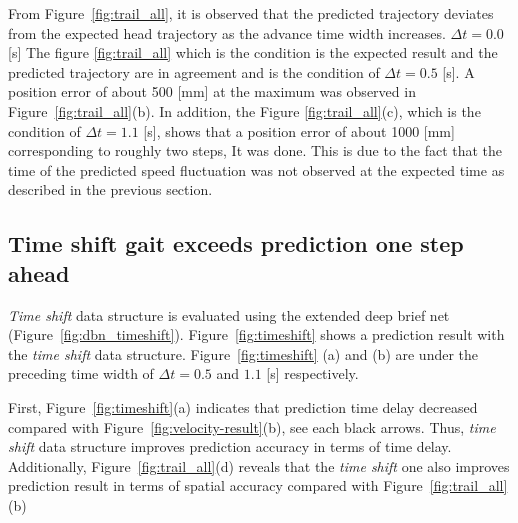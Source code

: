 \documentclass{sigchi}
\begin{document}
From Figure~\ref{fig:trail_all}, it is observed that the predicted trajectory deviates from the expected head trajectory as the advance time width increases. $ \Delta t = 0.0 $ [s] The figure \ref{fig:trail_all} which is the condition is the expected result and the predicted trajectory are in agreement and is the condition of $ \Delta t = 0.5 $ [s]. A position error of about 500 [mm] at the maximum was observed in Figure~\ref{fig:trail_all}(b). In addition, the Figure \ref{fig:trail_all}(c), which is the condition of $ \Delta t = 1.1 $ [s], shows that a position error of about 1000 [mm] corresponding to roughly two steps, It was done. This is due to the fact that the time of the predicted speed fluctuation was not observed at the expected time as described in the previous section.





\subsection{Time shift gait exceeds prediction one step ahead}

\textit{Time shift} data structure is evaluated using the extended deep brief net (Figure~\ref{fig:dbn_timeshift}). Figure~\ref{fig:timeshift} shows a prediction result with the \textit{time shift} data structure. Figure~\ref{fig:timeshift} (a) and (b) are under the preceding time width of $ \Delta t = 0.5$ and $1.1$ [s] respectively. 

First, Figure~\ref{fig:timeshift}(a) indicates that prediction time delay decreased compared with Figure~\ref{fig:velocity-result}(b), see each black arrows. Thus, \textit{time shift} data structure improves prediction accuracy in terms of time delay. Additionally, Figure~\ref{fig:trail_all}(d) reveals that the \textit{time shift} one also improves prediction result in terms of spatial accuracy compared with Figure~\ref{fig:trail_all}(b)
\end{document}
